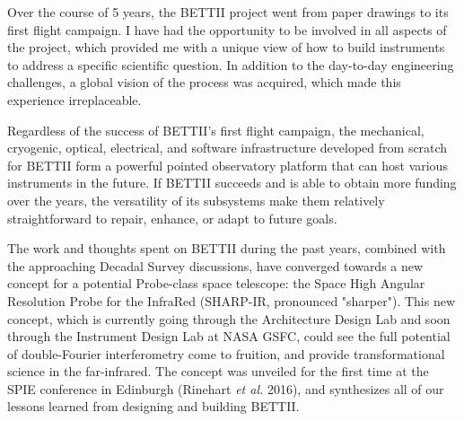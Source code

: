 \vspace{2cm}

Over the course of 5 years, the BETTII project went from paper drawings to its first flight campaign. I have had the opportunity to be involved in all aspects of the project, which provided me with a unique view of how to build instruments to address a specific scientific question. In addition to the day-to-day engineering challenges, a global vision of the process was acquired, which made this experience irreplaceable.


Regardless of the success of BETTII's first flight campaign, the mechanical, cryogenic, optical, electrical, and software infrastructure developed from scratch for BETTII form a powerful pointed observatory platform that can host various instruments in the future. If BETTII succeeds and is able to obtain more funding over the years, the versatility of its subsystems make them relatively straightforward to repair, enhance, or adapt to future goals. 

The work and thoughts spent on BETTII during the past years, combined with the approaching Decadal Survey discussions, have converged towards a new concept for a potential Probe-class space telescope: the Space High Angular Resolution Probe for the InfraRed (SHARP-IR, pronounced "sharper"). This new concept, which is currently going through the Architecture Design Lab and soon through the Instrument Design Lab at NASA GSFC, could see the full potential of double-Fourier interferometry come to fruition, and provide transformational science in the far-infrared. The concept was unveiled for the first time at the SPIE conference in Edinburgh (Rinehart \textit{et al.} 2016), and synthesizes all of our lessons learned from designing and building BETTII.




